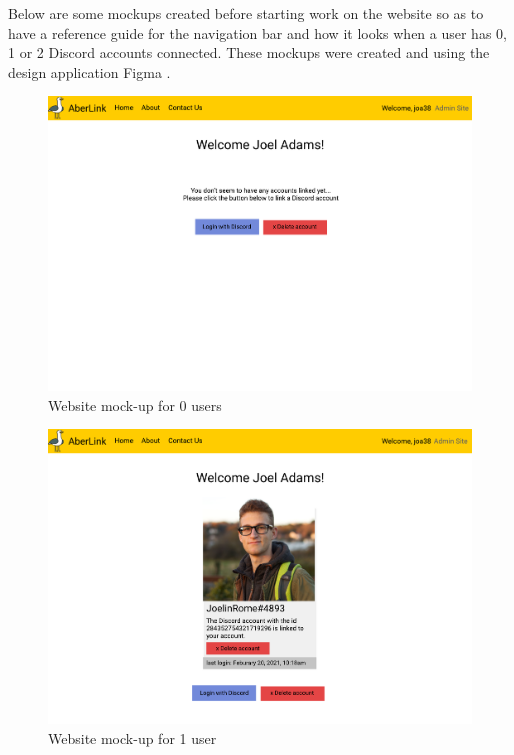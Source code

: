 Below are some mockups created before starting work on the website so as to have a reference guide for the navigation bar and how it looks when a user has 0, 1 or 2 Discord accounts connected. These mockups were created and using the design application Figma \cite{figma}.

\begin{figure}[H]
	\centering
	\includegraphics[width=0.9\linewidth]{Figures/AberLink-web-0}
	\caption{Website mock-up for 0 users}
	\label{fig:web-mock-0}
\end{figure}
\begin{figure}[H]
	\centering
	\includegraphics[width=0.9\linewidth]{Figures/AberLink-web-1}
	\caption{Website mock-up for 1 user}
	\label{fig:web-mock-1}
\end{figure}
